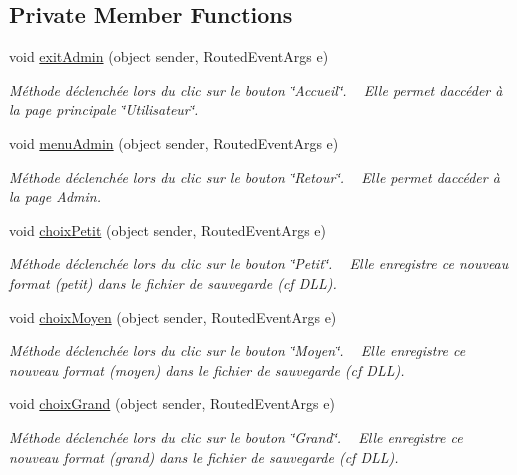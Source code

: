 \subsection*{Private Member Functions}
\begin{DoxyCompactItemize}
\item 
void \hyperlink{class_my_domotik_1_1_reglages_taille_icones_ac0ca448fea4d6ea808b0d84956ee51ec}{exit\+Admin} (object sender, Routed\+Event\+Args e)
\begin{DoxyCompactList}\small\item\em Méthode déclenchée lors du clic sur le bouton \char`\"{}\+Accueil\char`\"{}. ~\newline
Elle permet d\textquotesingle{}accéder à la page principale \char`\"{}\+Utilisateur\char`\"{}. \end{DoxyCompactList}\item 
void \hyperlink{class_my_domotik_1_1_reglages_taille_icones_ace2a23c4e95be5e4a3796e5422db6314}{menu\+Admin} (object sender, Routed\+Event\+Args e)
\begin{DoxyCompactList}\small\item\em Méthode déclenchée lors du clic sur le bouton \char`\"{}\+Retour\char`\"{}. ~\newline
Elle permet d\textquotesingle{}accéder à la page Admin. \end{DoxyCompactList}\item 
void \hyperlink{class_my_domotik_1_1_reglages_taille_icones_a947a9ada9f1a663975002162940e1157}{choix\+Petit} (object sender, Routed\+Event\+Args e)
\begin{DoxyCompactList}\small\item\em Méthode déclenchée lors du clic sur le bouton \char`\"{}\+Petit\char`\"{}. ~\newline
Elle enregistre ce nouveau format (petit) dans le fichier de sauvegarde (cf D\+LL). \end{DoxyCompactList}\item 
void \hyperlink{class_my_domotik_1_1_reglages_taille_icones_a8e32e7bf7546936a487f6323dfa655da}{choix\+Moyen} (object sender, Routed\+Event\+Args e)
\begin{DoxyCompactList}\small\item\em Méthode déclenchée lors du clic sur le bouton \char`\"{}\+Moyen\char`\"{}. ~\newline
Elle enregistre ce nouveau format (moyen) dans le fichier de sauvegarde (cf D\+LL). \end{DoxyCompactList}\item 
void \hyperlink{class_my_domotik_1_1_reglages_taille_icones_a6cefdbf5f9cb5c6c98a3c15cb8a2afc3}{choix\+Grand} (object sender, Routed\+Event\+Args e)
\begin{DoxyCompactList}\small\item\em Méthode déclenchée lors du clic sur le bouton \char`\"{}\+Grand\char`\"{}. ~\newline
Elle enregistre ce nouveau format (grand) dans le fichier de sauvegarde (cf D\+LL). \end{DoxyCompactList}\end{DoxyCompactItemize}
